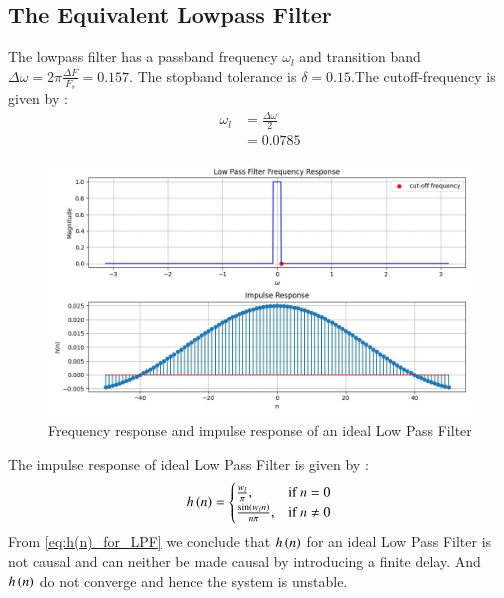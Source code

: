 \documentclass{article}
\begin{document}
\subsection{The Equivalent Lowpass Filter}
The lowpass filter has a passband frequency $\omega_l$ and transition band $\Delta \omega = 2\pi \frac{\Delta F}{F_s} = 0.157$.
The stopband tolerance is $\delta=0.15$.The cutoff-frequency is given by :
\begin{align}
    \omega_{l} & = \frac{\Delta \omega}{2} \\
               & = 0.0785
\end{align}
\begin{figure}[H]
    \centering
    \includegraphics[width=1\columnwidth]{figs/LPF_FIR.png}
    \caption{Frequency response and impulse response of an ideal Low Pass Filter}
    \label{fig:LPF_FIR_1}
\end{figure}

The impulse response of ideal Low Pass Filter is given by :
\begin{align}
    h\left(n\right) = 
    \begin{cases} 
        \frac{w_l}{\pi},          & \text{if } n = 0    \\
        \frac{\sin(w_l n)}{n\pi}, & \text{if } n \neq 0
    \end{cases} \label{eq:h(n)_for_LPF}
\end{align}
From \eqref{eq:h(n)_for_LPF} we conclude that $h\left(n\right)$ for an ideal Low Pass Filter is not causal and can neither be made causal by introducing a finite delay. And $h\left(n\right)$ do not converge and hence the system is unstable.
\end{document}
